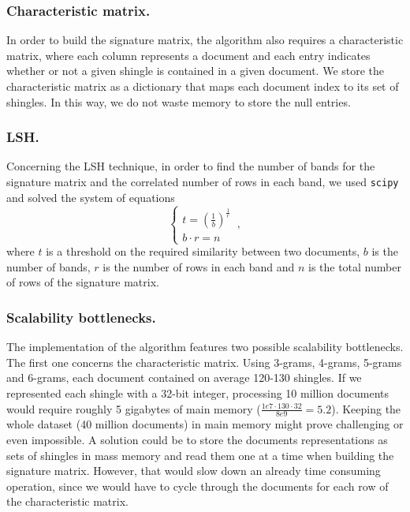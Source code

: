\documentclass[runningheads]{llncs}
\begin{document}
\subsubsection{Characteristic matrix.} In order to build the signature matrix, the algorithm also requires a characteristic matrix, where each column represents a document and each entry indicates whether or not a given shingle is contained in a given document. We store the characteristic matrix as a dictionary that maps each document index to its set of shingles. In this way, we do not waste memory to store the null entries.

\subsubsection{LSH.} Concerning the LSH technique, in order to find the number of bands for the signature matrix and the correlated number of rows in each band, we used \texttt{scipy} and solved the system of equations
\begin{equation}
  \begin{cases}
    t = (\frac{1}{b})^\frac{1}{r}\\
    b \cdot r = n
  \end{cases}\,,
\end{equation}
where $t$ is a threshold on the required similarity between two documents, $b$ is the number of bands, $r$ is the number of rows in each band and $n$ is the total number of rows of the signature matrix.

\subsubsection{Scalability bottlenecks.} The implementation of the algorithm features two possible scalability bottlenecks. The first one concerns the characteristic matrix. Using 3-grams, 4-grams, 5-grams and 6-grams, each document contained on average 120-130 shingles. If we represented each shingle with a 32-bit integer, processing 10 million documents would require roughly 5 gigabytes of main memory ($\frac{1e7 \cdot 130 \cdot 32}{8e9} = 5.2$). Keeping the whole dataset (40 million documents) in main memory might prove challenging or even impossible. A solution could be to store the documents representations as sets of shingles in mass memory and read them one at a time when building the signature matrix. However, that would slow down an already time consuming operation, since we would have to cycle through the documents for each row of the characteristic matrix.
\end{document}
